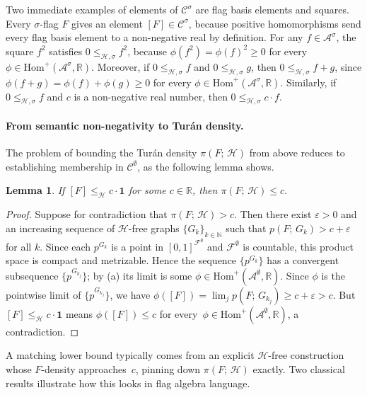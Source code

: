 \documentclass{article}
\newtheorem{lemma}[lemma]{Lemma}
\newcommand{\poshom}[1]{\mathrm{Hom}^+(\mathcal{A}^{#1}, \mathbb{R})}
\newcommand{\den}[2]{p(#1;\,#2)}
\newcommand{\tdensity}[2]{\pi(#1;\,#2)}
\begin{document}
Two immediate examples of elements of $\mathcal{C}^\sigma$ are flag basis
elements and squares.  Every $\sigma$-flag $F$ gives an element
$[F]\in\mathcal{C}^\sigma$, because positive homomorphisms send every flag
basis element to a non-negative real by definition.
For any $f \in \mathcal{A}^\sigma$, the square $f^2$ satisfies $0 \leq_{\mathcal{H},\sigma} f^2$,
because $\phi(f^2) = \phi(f)^2 \geq 0$ for every~$\phi \in \poshom{\sigma}$.
Moreover, if $0 \leq_{\mathcal{H},\sigma} f$ and $0 \leq_{\mathcal{H},\sigma} g$, then $0 \leq_{\mathcal{H},\sigma} f + g$,
since $\phi(f+g) = \phi(f) + \phi(g) \geq 0$ for every $\phi \in \poshom{\sigma}$.
Similarly, if $0 \leq_{\mathcal{H},\sigma} f$ and $c$ is a non-negative real number, then $0 \leq_{\mathcal{H},\sigma} c \cdot f$.

\paragraph{From semantic non-negativity to Tur\'an density.}
The problem of bounding the Tur\'an density $\tdensity{F}{\mathcal{H}}$ from above
reduces to establishing membership in $\mathcal{C}^\emptyset$, as the following
lemma shows.

\begin{lemma}\label{lem:semantic-bound}
  If $[F] \leq_{\mathcal{H}} c \cdot \mathbf{1}$ for some $c \in \mathbb{R}$, then
  $\tdensity{F}{\mathcal{H}} \leq c$.
\end{lemma}
\begin{proof}
  Suppose for contradiction that $\tdensity{F}{\mathcal{H}} > c$.  Then
  there exist $\varepsilon > 0$ and an increasing sequence of
  \(\mathcal{H}\)-free graphs $\{G_k\}_{k\in\mathbb{N}}$ such that
  $\den{F}{G_k} > c + \varepsilon$ for all $k$.  Since each $p^{G_k}$
  is a point in $[0,1]^{\mathcal{F}^\emptyset}$ and
  $\mathcal{F}^\emptyset$ is countable, this product space is compact and
  metrizable.  Hence the sequence $\{p^{G_k}\}$ has a convergent
  subsequence $\{p^{G_{k_j}}\}$; by (a) its limit is some
  $\phi \in \poshom{\emptyset}$.  Since $\phi$ is the pointwise limit of
  $\{p^{G_{k_j}}\}$, we have
  $\phi([F]) = \lim_j \den{F}{G_{k_j}} \geq c + \varepsilon > c$.  But
  $[F] \leq_{\mathcal{H}} c \cdot \mathbf{1}$ means $\phi([F]) \leq c$ for every~$\phi \in \poshom{\emptyset}$, a contradiction.
\end{proof}

A matching lower bound typically comes from an explicit \(\mathcal{H}\)-free construction
whose $F$-density approaches~$c$, pinning down $\tdensity{F}{\mathcal{H}}$ exactly.
Two classical results illustrate how this looks in flag algebra language.
\end{document}
